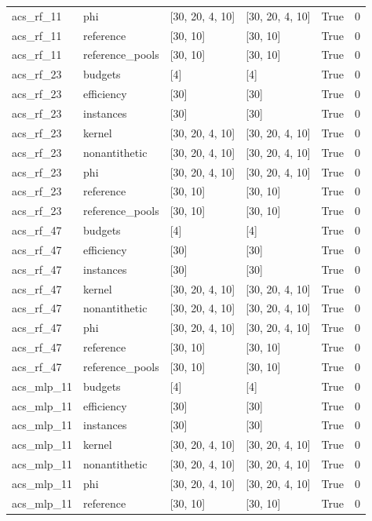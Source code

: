 \begin{tabular}{llllll}
acs\_rf\_11 & phi & [30, 20, 4, 10] & [30, 20, 4, 10] & True & 0 \\
acs\_rf\_11 & reference & [30, 10] & [30, 10] & True & 0 \\
acs\_rf\_11 & reference\_pools & [30, 10] & [30, 10] & True & 0 \\
acs\_rf\_23 & budgets & [4] & [4] & True & 0 \\
acs\_rf\_23 & efficiency & [30] & [30] & True & 0 \\
acs\_rf\_23 & instances & [30] & [30] & True & 0 \\
acs\_rf\_23 & kernel & [30, 20, 4, 10] & [30, 20, 4, 10] & True & 0 \\
acs\_rf\_23 & nonantithetic & [30, 20, 4, 10] & [30, 20, 4, 10] & True & 0 \\
acs\_rf\_23 & phi & [30, 20, 4, 10] & [30, 20, 4, 10] & True & 0 \\
acs\_rf\_23 & reference & [30, 10] & [30, 10] & True & 0 \\
acs\_rf\_23 & reference\_pools & [30, 10] & [30, 10] & True & 0 \\
acs\_rf\_47 & budgets & [4] & [4] & True & 0 \\
acs\_rf\_47 & efficiency & [30] & [30] & True & 0 \\
acs\_rf\_47 & instances & [30] & [30] & True & 0 \\
acs\_rf\_47 & kernel & [30, 20, 4, 10] & [30, 20, 4, 10] & True & 0 \\
acs\_rf\_47 & nonantithetic & [30, 20, 4, 10] & [30, 20, 4, 10] & True & 0 \\
acs\_rf\_47 & phi & [30, 20, 4, 10] & [30, 20, 4, 10] & True & 0 \\
acs\_rf\_47 & reference & [30, 10] & [30, 10] & True & 0 \\
acs\_rf\_47 & reference\_pools & [30, 10] & [30, 10] & True & 0 \\
acs\_mlp\_11 & budgets & [4] & [4] & True & 0 \\
acs\_mlp\_11 & efficiency & [30] & [30] & True & 0 \\
acs\_mlp\_11 & instances & [30] & [30] & True & 0 \\
acs\_mlp\_11 & kernel & [30, 20, 4, 10] & [30, 20, 4, 10] & True & 0 \\
acs\_mlp\_11 & nonantithetic & [30, 20, 4, 10] & [30, 20, 4, 10] & True & 0 \\
acs\_mlp\_11 & phi & [30, 20, 4, 10] & [30, 20, 4, 10] & True & 0 \\
acs\_mlp\_11 & reference & [30, 10] & [30, 10] & True & 0 \\

\end{tabular}
